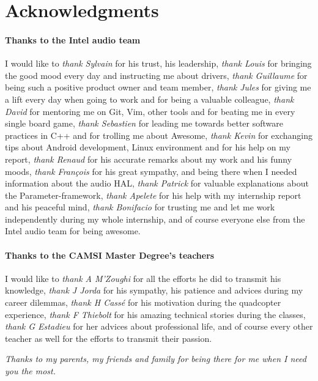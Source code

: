 \chapter*{Acknowledgments}

\subsubsection*{Thanks to the Intel audio team}
I would like to
\emph{thank Sylvain} for his trust, his leadership,
\emph{thank Louis} for bringing the good mood every day and instructing me about drivers,
\emph{thank Guillaume} for being such a positive product owner and team member,
\emph{thank Jules} for giving me a lift every day when going to work and for being a valuable colleague,
\emph{thank David} for mentoring me on Git, Vim, other tools and for beating me in every single board game,
\emph{thank Sebastien} for leading me towards better software practices in C++ and for trolling me about Awesome,
\emph{thank Kevin} for exchanging tips about Android development, Linux environment and for his help on my report,
\emph{thank Renaud} for his accurate remarks about my work and his funny moods,
\emph{thank François} for his great sympathy, and being there when I needed information about the audio HAL,
\emph{thank Patrick} for valuable explanations about the Parameter-framework,
\emph{thank Apelete} for his help with my internship report and his peaceful mind,
\emph{thank Bonifacio} for trusting me and let me work independently during my whole internship,
and of course everyone else from the Intel audio team for being awesome.

\subsubsection*{Thanks to the CAMSI Master Degree's teachers}
I would like to
\emph{thank A M'Zoughi} for all the efforts he did to transmit his knowledge,
\emph{thank J Jorda} for his sympathy, his patience and advices during my career dilemmas,
\emph{thank H Cassé} for his motivation during the quadcopter experience,
\emph{thank F Thiebolt} for his amazing technical stories during the classes,
\emph{thank G Estadieu} for her advices about professional life,
and of course every other teacher as well for the efforts to transmit their passion.

\vfill

\begin{minipage}{0.49\textwidth}
\begin{flushright}
\end{flushright}
\end{minipage}
\begin{minipage}{0.49\textwidth}
\begin{flushleft}
  \emph{Thanks to my parents, my friends and family for being there for me when I need you the most.}
\end{flushleft}
\end{minipage}
